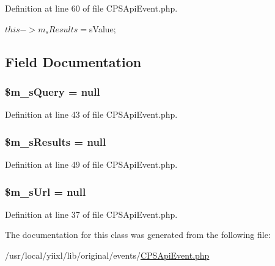 Definition at line 60 of file CPSApiEvent.php.




\begin{DoxyCode}
{ $this->m_sResults = $sValue; }
\end{DoxyCode}




\subsection{Field Documentation}
\hypertarget{classCPSApiEvent_a3d8ef5c5637fd1aa893e2a3a62b45a5a}{
\subsubsection[{\$m\_\-sQuery}]{\setlength{\rightskip}{0pt plus 5cm}\$m\_\-sQuery = null}}
\label{classCPSApiEvent_a3d8ef5c5637fd1aa893e2a3a62b45a5a}


Definition at line 43 of file CPSApiEvent.php.

\hypertarget{classCPSApiEvent_a754b3666c127a03700fe876153602f62}{
\subsubsection[{\$m\_\-sResults}]{\setlength{\rightskip}{0pt plus 5cm}\$m\_\-sResults = null}}
\label{classCPSApiEvent_a754b3666c127a03700fe876153602f62}


Definition at line 49 of file CPSApiEvent.php.

\hypertarget{classCPSApiEvent_ab16efc62694fc7d6620d2f951db167ac}{
\subsubsection[{\$m\_\-sUrl}]{\setlength{\rightskip}{0pt plus 5cm}\$m\_\-sUrl = null}}
\label{classCPSApiEvent_ab16efc62694fc7d6620d2f951db167ac}


Definition at line 37 of file CPSApiEvent.php.



The documentation for this class was generated from the following file:\begin{DoxyCompactItemize}
\item 
/usr/local/yiixl/lib/original/events/\hyperlink{CPSApiEvent_8php}{CPSApiEvent.php}\end{DoxyCompactItemize}
